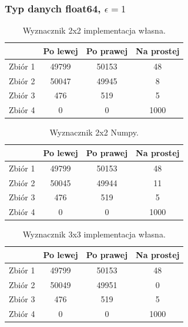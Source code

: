 \documentclass[11pt]{scrartcl}
\begin{document}
    \subsubsection{Typ danych float64, $\epsilon=1$}
    \begin{table}[H]
        \centering
        \renewcommand{\arraystretch}{1.5}
        \begin{tabular}{| c | c | c | c |}
            \hline
            & Po lewej & Po prawej & Na prostej \\
            \hline
            Zbiór 1 & 49799 & 50153 & 48 \\
            \hline
            Zbiór 2 & 50047 & 49945 & 8 \\
            \hline
            Zbiór 3 & 476 & 519 & 5 \\
            \hline
            Zbiór 4 & 0 & 0 & 1000 \\
            \hline
        \end{tabular}
        \renewcommand{\arraystretch}{1.5}
        \caption{Wyznacznik 2x2 implementacja własna.}
    \end{table}
    \begin{table}[H]
        \centering
        \renewcommand{\arraystretch}{1.5}
        \begin{tabular}{| c | c | c | c |}
            \hline
            & Po lewej & Po prawej & Na prostej \\
            \hline
            Zbiór 1 & 49799 & 50153 & 48 \\
            \hline
            Zbiór 2 & 50045 & 49944 & 11 \\
            \hline
            Zbiór 3 & 476 & 519 & 5 \\
            \hline
            Zbiór 4 & 0 & 0 & 1000 \\
            \hline
        \end{tabular}
        \renewcommand{\arraystretch}{1.5}
        \caption{Wyznacznik 2x2 Numpy.}
    \end{table}
    \begin{table}[H]
        \centering
        \renewcommand{\arraystretch}{1.5}
        \begin{tabular}{| c | c | c | c |}
            \hline
            & Po lewej & Po prawej & Na prostej \\
            \hline
            Zbiór 1 & 49799 & 50153 & 48 \\
            \hline
            Zbiór 2 & 50049 & 49951 & 0 \\
            \hline
            Zbiór 3 & 476 & 519 & 5 \\
            \hline
            Zbiór 4 & 0 & 0 & 1000 \\
            \hline
        \end{tabular}
        \renewcommand{\arraystretch}{1.5}
        \caption{Wyznacznik 3x3 implementacja własna.}
    \end{table}
\end{document}
